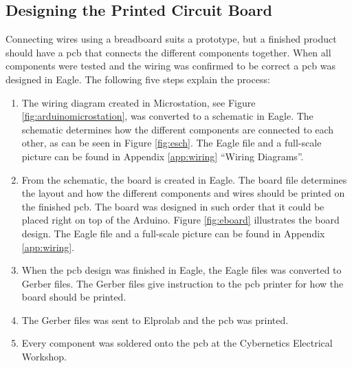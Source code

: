 \subsection{Designing the Printed Circuit Board}
Connecting wires using a breadboard suits a prototype, but a finished product should have a \acrshort{pcb} that connects the different components together. When all components were tested and the wiring was confirmed to be correct a \acrshort{pcb} was designed in Eagle. The following five steps explain the process:
\begin{enumerate}[1.]
\item The wiring diagram created in Microstation, see Figure \ref{fig:arduinomicrostation}, was converted to a schematic in Eagle. The schematic determines how the different components are connected to each other, as can be seen in Figure \ref{fig:esch}. The Eagle file and a full-scale picture can be found in Appendix \ref{app:wiring} ``Wiring Diagrams''.
\item From the schematic, the board is created in Eagle. The board file determines the layout and how the different components and wires should be printed on the finished \acrshort{pcb}. The board was designed in such order that it could be placed right on top of the Arduino. Figure \ref{fig:eboard} illustrates the board design. The Eagle file and a full-scale picture can be found in Appendix \ref{app:wiring}.
\item When the \acrshort{pcb} design was finished in Eagle, the Eagle files was converted to Gerber files. The Gerber files give instruction to the \acrshort{pcb} printer for how the board should be printed.
\item The Gerber files was sent to Elprolab and the \acrshort{pcb} was printed.
\item Every component was soldered onto the \acrshort{pcb} at the Cybernetics Electrical Workshop.
\end{enumerate}